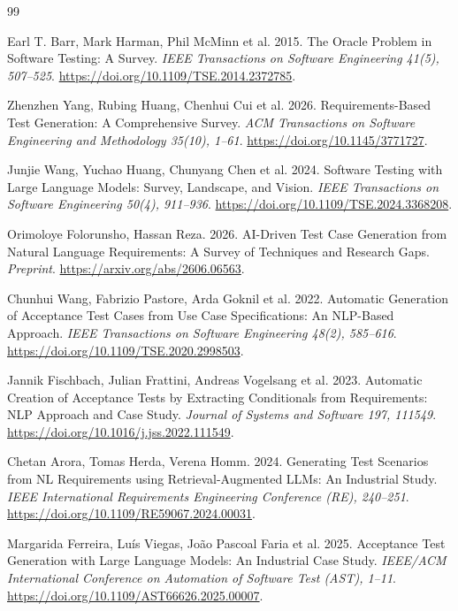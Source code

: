 \documentclass[sigconf,nonacm]{acmart}
\begin{document}
\balance
\begin{thebibliography}{99}
\raggedright
{} Earl T. Barr, Mark Harman, Phil McMinn et al. 2015. The Oracle Problem in Software Testing: A Survey. \emph{IEEE Transactions on Software Engineering 41(5), 507--525}. \url{https://doi.org/10.1109/TSE.2014.2372785}.

 Zhenzhen Yang, Rubing Huang, Chenhui Cui et al. 2026. Requirements-Based Test Generation: A Comprehensive Survey. \emph{ACM Transactions on Software Engineering and Methodology 35(10), 1--61}. \url{https://doi.org/10.1145/3771727}.

 Junjie Wang, Yuchao Huang, Chunyang Chen et al. 2024. Software Testing with Large Language Models: Survey, Landscape, and Vision. \emph{IEEE Transactions on Software Engineering 50(4), 911--936}. \url{https://doi.org/10.1109/TSE.2024.3368208}.

 Orimoloye Folorunsho, Hassan Reza. 2026. AI-Driven Test Case Generation from Natural Language Requirements: A Survey of Techniques and Research Gaps. \emph{Preprint}. \url{https://arxiv.org/abs/2606.06563}.

 Chunhui Wang, Fabrizio Pastore, Arda Goknil et al. 2022. Automatic Generation of Acceptance Test Cases from Use Case Specifications: An NLP-Based Approach. \emph{IEEE Transactions on Software Engineering 48(2), 585--616}. \url{https://doi.org/10.1109/TSE.2020.2998503}.

 Jannik Fischbach, Julian Frattini, Andreas Vogelsang et al. 2023. Automatic Creation of Acceptance Tests by Extracting Conditionals from Requirements: NLP Approach and Case Study. \emph{Journal of Systems and Software 197, 111549}. \url{https://doi.org/10.1016/j.jss.2022.111549}.

 Chetan Arora, Tomas Herda, Verena Homm. 2024. Generating Test Scenarios from NL Requirements using Retrieval-Augmented LLMs: An Industrial Study. \emph{IEEE International Requirements Engineering Conference (RE), 240--251}. \url{https://doi.org/10.1109/RE59067.2024.00031}.

 Margarida Ferreira, Lu\'{i}s Viegas, Jo\~{a}o Pascoal Faria et al. 2025. Acceptance Test Generation with Large Language Models: An Industrial Case Study. \emph{IEEE/ACM International Conference on Automation of Software Test (AST), 1--11}. \url{https://doi.org/10.1109/AST66626.2025.00007}.


\end{thebibliography}
\end{document}
